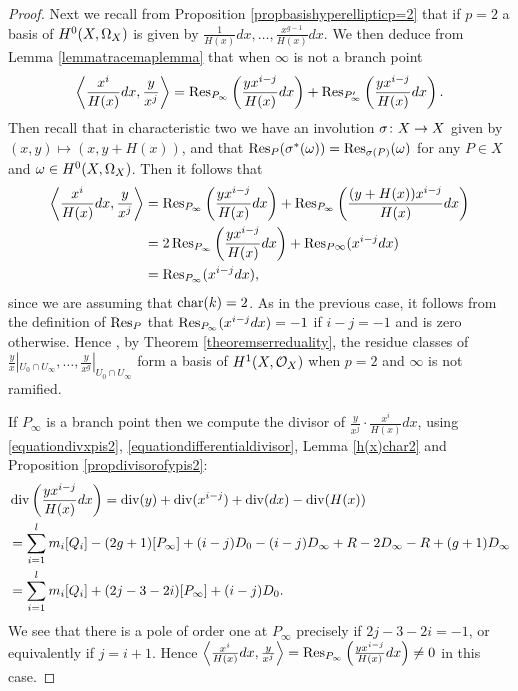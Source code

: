 \begin{proof}
    Next we recall from Proposition \ref{propbasishyperellipticp=2}  that if $p=2$ a basis of ${H^0(X,\Omega_X)}$ is given by $\frac{1}{H(x)}dx, \ldots, \frac{x^{g-1}}{H(x)}dx$.
    We then deduce from Lemma \ref{lemmatracemaplemma} that when $\infty$ is not a branch point
        \[
        \left \langle \frac{x^i}{H(x)}dx, \frac{y}{x^j} \right \rangle = \operatorname{Res}_{P_\infty} \left( \frac{yx^{i-j}}{H(x)}dx \right) + \operatorname{Res}_{P_\infty'}\left( \frac{yx^{i-j}}{H(x)} dx \right).
        \]
    Then recall that in characteristic two we have an involution $\sigma \colon X \rightarrow X$ given by $(x,y) \mapsto (x, y + H(x))$, and that $\operatorname{Res}_P(\sigma^*(\omega)) = \operatorname{Res}_{\sigma(P)}(\omega)$ for any $P \in X$ and $\omega\in {H^0(X,\Omega_X)}$.
    Then it follows that
        \begin{align*}
        \left \langle \frac{x^i}{H(x)}dx, \frac{y}{x^j} \right \rangle & = \operatorname{Res}_{P_ \infty} \left( \frac{yx^{i-j}}{H(x)}dx \right) + \operatorname{Res}_{P_ \infty} \left( \frac{(y+H(x))x^{i-j}}{H(x)}dx \right) \\
        & = 2\operatorname{Res}_{P_\infty}\left( \frac{yx^{i-j}}{H(x)}dx \right) + \operatorname{Res}_{P \infty}(x^{i-j}dx) \\
        & = \operatorname{Res}_{P_\infty}(x^{i-j}dx),
        \end{align*}
    since we are assuming that $\operatorname{char}(k) = 2$.
    As in the previous case, it follows from the definition of $\operatorname{Res}_P$ that $\operatorname{Res}_{P_\infty}(x^{i-j}dx) = -1$ if $i-j = -1$ and is zero otherwise.
    Hence , by Theorem \ref{theoremserreduality}, the residue classes of $\frac{y}{x}|_{U_0 \cap U_\infty}, \ldots, \frac{y}{x^g}|_{U_0 \cap U_\infty}$ form a basis of $H^1(X,\mathcal{O}_X)$ when $p = 2$ and $\infty$ is not ramified.
    
    
    
    If $P_\infty$ is a branch point then we compute the divisor of $ \frac{y}{x^j} \cdot \frac{x^i}{H(x)}dx$, using \eqref{equationdivxpis2}, \eqref{equationdifferentialdivisor}, Lemma \ref{h(x)char2} and Proposition \ref{propdivisorofypis2}:
        \begin{align*}
        &\operatorname{div}\left( \frac{yx^{i-j}}{H(x)}dx \right)  = \operatorname{div}(y) + \operatorname{div}(x^{i-j}) + \operatorname{div}( dx) - \operatorname{div}(H(x)) \\
        & = \sum_{i=1}^l m_i[Q_i] - (2g+ 1 )[P_\infty] + (i-j)D_0 - (i-j)D_\infty + R - 2D_\infty  - R + (g+1)D_\infty\\
        & = \sum_{i=1}^l m_i[Q_i] + (2j-3-2i)[P_\infty] + (i-j)D_0.
        \end{align*}
    We see that there is a pole of order one at $P_\infty$ precisely if $2j - 3 - 2i = -1$, or equivalently if $j = i+1$.
    Hence $\left\langle \frac{x^i}{H(x)}dx, \frac{y}{x^j} \right\rangle = \operatorname{Res}_{P_ \infty}\left( \frac{yx^{i-j}}{H(x)}dx\right)  \neq 0$ in this case.
    

\end{proof}
